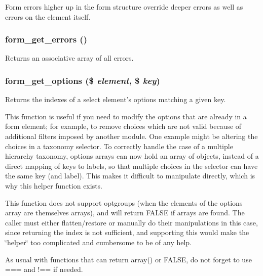 Form errors higher up in the form structure override deeper errors as well as errors on the element itself. \hypertarget{group__form__api_ga158b3db5e88e96bf060c524cebcb8130}{
\subsubsection[{form\_\-get\_\-errors}]{\setlength{\rightskip}{0pt plus 5cm}form\_\-get\_\-errors ()}}
\label{group__form__api_ga158b3db5e88e96bf060c524cebcb8130}
Returns an associative array of all errors. \hypertarget{group__form__api_ga88bf27e1f6246789acc77dd1686e0276}{
\subsubsection[{form\_\-get\_\-options}]{\setlength{\rightskip}{0pt plus 5cm}form\_\-get\_\-options (\$ {\em element}, \/  \$ {\em key})}}
\label{group__form__api_ga88bf27e1f6246789acc77dd1686e0276}
Returns the indexes of a select element's options matching a given key.

This function is useful if you need to modify the options that are already in a form element; for example, to remove choices which are not valid because of additional filters imposed by another module. One example might be altering the choices in a taxonomy selector. To correctly handle the case of a multiple hierarchy taxonomy, options arrays can now hold an array of objects, instead of a direct mapping of keys to labels, so that multiple choices in the selector can have the same key (and label). This makes it difficult to manipulate directly, which is why this helper function exists.

This function does not support optgroups (when the elements of the options array are themselves arrays), and will return FALSE if arrays are found. The caller must either flatten/restore or manually do their manipulations in this case, since returning the index is not sufficient, and supporting this would make the \char`\"{}helper\char`\"{} too complicated and cumbersome to be of any help.

As usual with functions that can return array() or FALSE, do not forget to use === and !== if needed.


